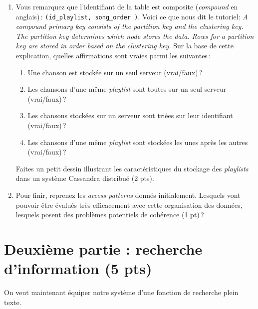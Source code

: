 \documentclass[11pt,a4paper]{article}
\begin{document}
\begin{enumerate}
 \item Vous remarquez que l'identifiant de la table est composite (\textit{compound} en anglais)\,: \texttt{(id\_playlist, song\_order )}. Voici
 ce que nous dit le tutoriel: \textit{A compound primary key consists of the partition key and the clustering key. 
 The partition key determines which node stores the data. Rows for a partition key are stored in order based 
 on the clustering key.} Sur la base de cette explication, quelles affirmations sont vraies parmi les suivantes\,:
 
 \begin{enumerate}
    \item Une chanson est stockée sur un seul serveur (vrai/faux)\,?
    \item Les chansons d'une même \textit{playlist} sont toutes sur un seul serveur (vrai/faux)\,?
    \item Les chansons stockées sur un serveur sont triées sur leur identifiant (vrai/faux)\,?
    \item Les chansons d'une même \textit{playlist} sont stockées les unes après les autres (vrai/faux)\,?
 \end{enumerate}
 
   Faites un petit dessin illustrant les caractéristiques du stockage des \textit{playlists} 
   dans un système Cassandra distribué (2 pts).
   
   \item Pour finir, reprenez les \textit{access patterns} donnés initialement. Lesquels
   vont pouvoir être évalués très efficacement avec cette organisation des données, lesquels
   posent des problèmes potentiels de cohérence (1 pt)\,?
 \end{enumerate}


\section*{Deuxième partie : recherche d'information (5 pts)}

On veut maintenant équiper notre système d'une fonction de recherche plein texte. 
\end{document}
